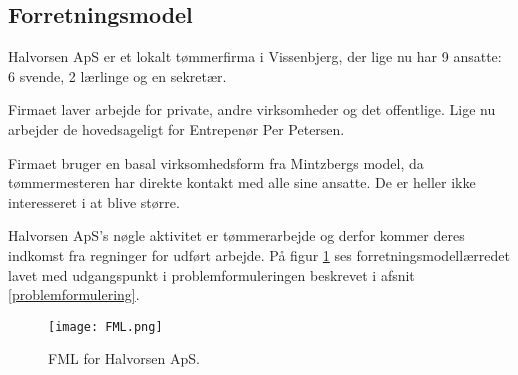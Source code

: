 \subsection{Forretningsmodel}

Halvorsen ApS er et lokalt tømmerfirma i Vissenbjerg, der lige nu har 9 ansatte: 6 svende, 2 lærlinge og en sekretær.

Firmaet laver arbejde for private, andre virksomheder og det offentlige.
Lige nu arbejder de hovedsageligt for Entrepenør Per Petersen.

Firmaet bruger en basal virksomhedsform fra Mintzbergs model, da tømmermesteren har direkte kontakt med alle sine ansatte. De er heller ikke interesseret i at blive større.\cite{organisation}

Halvorsen ApS's nøgle aktivitet er tømmerarbejde og derfor kommer deres indkomst fra regninger for udført arbejde. På figur \ref{forretningsmodelfigur} ses forretningsmodellærredet lavet med udgangspunkt i problemformuleringen beskrevet i afsnit \ref{problemformulering}.

\begin{figure} 
    \caption{FML for Halvorsen ApS.}
    \centering
    \texttt{[image: FML.png]}
    \label{forretningsmodelfigur}
\end{figure}
